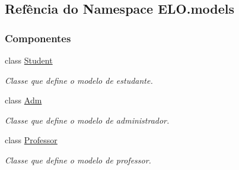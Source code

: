 \hypertarget{namespaceELO_1_1models}{\subsection{Refência do Namespace E\-L\-O.\-models}
\label{namespaceELO_1_1models}
}
\subsubsection*{Componentes}
\begin{DoxyCompactItemize}
\item 
class \hyperlink{classELO_1_1models_1_1Student}{Student}
\begin{DoxyCompactList}\small\item\em Classe que define o modelo de estudante. \end{DoxyCompactList}\item 
class \hyperlink{classELO_1_1models_1_1Adm}{Adm}
\begin{DoxyCompactList}\small\item\em Classe que define o modelo de administrador. \end{DoxyCompactList}\item 
class \hyperlink{classELO_1_1models_1_1Professor}{Professor}
\begin{DoxyCompactList}\small\item\em Classe que define o modelo de professor. \end{DoxyCompactList}\end{DoxyCompactItemize}
